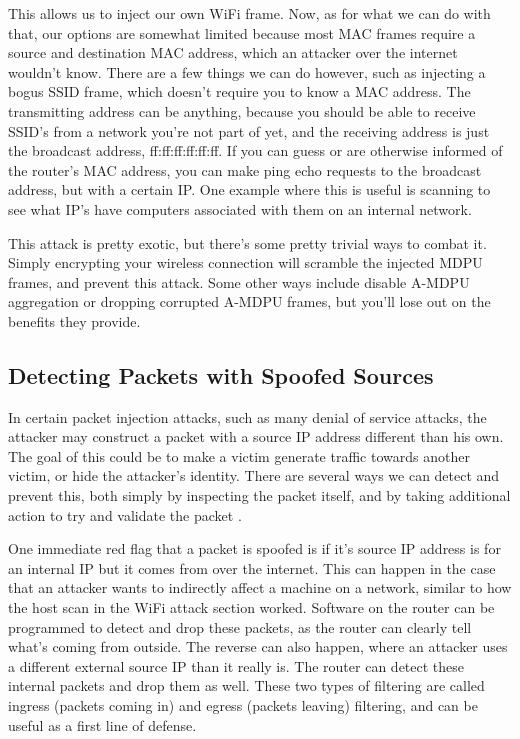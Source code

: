 \documentclass[journal]{IEEEtran}
\begin{document}
This allows us to inject our own WiFi frame. Now, as for what we can do with that, our options are somewhat limited because most MAC frames require a source and destination MAC address, which an attacker over the internet wouldn't know. There are a few things we can do however, such as injecting a bogus SSID frame, which doesn't require you to know a MAC address. The transmitting address can be anything, because you should be able to receive SSID's from a network you're not part of yet, and the receiving address is just the broadcast address, ff:ff:ff:ff:ff:ff. If you can guess or are otherwise informed of the router's MAC address, you can make ping echo requests to the broadcast address, but with a certain IP. One example where this is useful is scanning to see what IP's have computers associated with them on an internal network.

This attack is pretty exotic, but there's some pretty trivial ways to combat it. Simply encrypting your wireless connection will scramble the injected MDPU frames, and prevent this attack. Some other ways include disable A-MDPU aggregation or dropping corrupted A-MDPU frames, but you'll lose out on the benefits they provide. 

\subsection{Detecting Packets with Spoofed Sources}

In certain packet injection attacks, such as many denial of service attacks, the attacker may construct a packet with a source IP address different than his own. The goal of this could be to make a victim generate traffic towards another victim, or hide the attacker's identity. There are several ways we can detect and prevent this, both simply by inspecting the packet itself, and by taking additional action to try and validate the packet \cite{detectingspoofs}.

One immediate red flag that a packet is spoofed is if it's source IP address is for an internal IP but it comes from over the internet. This can happen in the case that an attacker wants to indirectly affect a machine on a network, similar to how the host scan in the WiFi attack section worked. Software on the router can be programmed to detect and drop these packets, as the router can clearly tell what's coming from outside. The reverse can also happen, where an attacker uses a different external source IP than it really is. The router can detect these internal packets and drop them as well. These two types of filtering are called ingress (packets coming in) and egress (packets leaving) filtering, and can be useful as a first line of defense.
\end{document}
